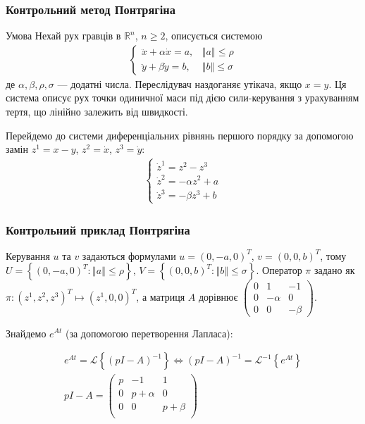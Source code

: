 \documentclass[10pt,pdf]{beamer}
\newcommand{\R}{\mathbb{R}}
\renewcommand{\d}[1]{\dot{#1}}
\newcommand{\dd}[1]{\ddot{#1}}
\renewcommand{\l}{\left}
\renewcommand{\r}{\right}
\newcommand{\norm}[1]{\left\Vert #1 \right\Vert}
\newcommand{\Lap}[1]{\mathcal{L}\l\{#1\r\}}
\newcommand{\LapInv}[1]{\mathcal{L}^{-1}\l\{#1\r\}}
\begin{document}
    \begin{frame}
        \frametitle{Контрольний метод Понтрягіна}
    
        \begin{block}{Умова}
            Нехай рух гравців в $\R^n$, $n\geq 2$, описується системою
            \begin{gather*}
                \begin{cases}
                    \dd{x} + \alpha \d{x} = a, & \norm{a} \leq \rho \\
                    \dd{y} + \beta \d{y} = b, & \norm{b} \leq \sigma
                \end{cases}
            \end{gather*}
            де $\alpha, \beta, \rho, \sigma$ --- додатні числа. Переслідувач наздоганяє утікача, якщо $x=y$.
            Ця система описує рух точки одиничної маси під дією сили-керування з урахуванням тертя,
            що лінійно залежить від швидкості.
        \end{block}

        Перейдемо до системи диференціальних рівнянь першого порядку за допомогою замін $z^1 = x - y$, $z^2 = \d{x}$, $z^3 = \d{y}$:
        \begin{gather*}
            \begin{cases}
                \d{z}^1 = z^2 - z^3 \\
                \d{z}^2 = -\alpha z^2 + a \\
                \d{z}^3 = -\beta z^3 + b
            \end{cases}
        \end{gather*}
    \end{frame}
    \begin{frame}
        \frametitle{Контрольний приклад Понтрягіна}
    
        Керування $u$ та $v$ задаються формулами $u = (0, -a, 0)^T$, $v = (0, 0, b)^T$, тому
        $U = \l\{(0, -a, 0)^T : \norm{a} \leq \rho \r\}$, $V = \l\{(0, 0, b)^T : \norm{b} \leq \sigma \r\}$.
        Оператор $\pi$ задано як $\pi: (z^1, z^2, z^3)^T \mapsto (z^1, 0, 0)^T$, а матриця $A$
        дорівнює $\begin{pmatrix}
            0 & 1 & -1 \\
            0 & -\alpha & 0 \\
            0 & 0 & -\beta
        \end{pmatrix}$. 
        
        Знайдемо $e^{A t}$ (за допомогою перетворення Лапласа):
    
        \begin{gather*}
            e^{At} = \Lap{(pI - A)^{-1}} \Leftrightarrow (pI - A)^{-1} = \LapInv{e^{At}} \\
            pI - A = \begin{pmatrix}
                p & -1 & 1 \\
                0 & p+\alpha & 0 \\
                0 & 0 & p + \beta \\
            \end{pmatrix}
        \end{gather*}
    \end{frame}
\end{document}
